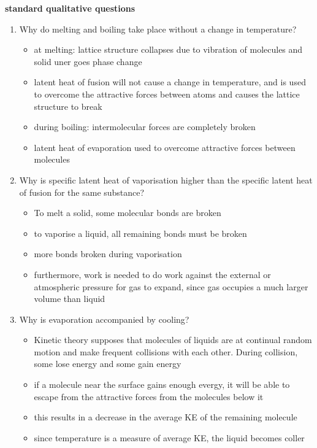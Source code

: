 \documentclass[a4paper, 10pt]{article}
\begin{document}
\textbf{standard qualitative questions}
\begin{enumerate}
   \item Why do melting and boiling take place without a change in temperature?
      \begin{itemize}
         \item at melting: lattice structure collapses due to vibration of molecules and solid uner goes phase change
         \item latent heat of fusion will not cause a change in temperature, and is used to overcome the attractive forces between atoms and causes the lattice structure to break
         \item during boiling: intermolecular forces are completely broken
         \item latent heat of evaporation used to overcome attractive forces between molecules
      \end{itemize}	
   \item Why is specific latent heat of vaporisation higher than the specific latent heat of fusion for the same substance?
      \begin{itemize}
         \item To melt a solid, some molecular bonds are broken
         \item to vaporise a liquid, all remaining bonds must be broken
         \item more bonds broken during vaporisation
         \item furthermore, work is needed to do work against the external or atmospheric pressure for gas to expand, since gas occupies a much larger volume than liquid
      \end{itemize}	
   \item Why is evaporation accompanied by cooling? 
      \begin{itemize}
         \item Kinetic theory supposes that molecules of liquids are at continual random motion and make frequent collisions with each other. During collision, some lose energy and some gain energy
         \item if a molecule near the surface gains enough evergy, it will be able to escape from the attractive forces from the molecules below it
         \item this results in a decrease in the average KE of the remaining molecule
         \item since temperature is a measure of average KE, the liquid becomes coller
      \end{itemize}	
\end{enumerate}	
\end{document}
